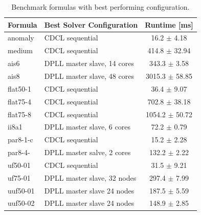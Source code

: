 \documentclass[letterpaper]{article}
\begin{document}
\begin{table}
    \centering
    \begin{tabular}{|l|l|c|}
        \hline
        Formula & Best Solver Configuration & Runtime [ms]\\
        \hline
        \hline
        anomaly & CDCL sequential & 16.2 $\pm$ 4.18 \\
        \hline
        medium & CDCL sequential & 414.8 $\pm$ 32.94 \\
        \hline
        ais6 & DPLL master slave, 14 cores & 343.3 $\pm$ 3.58 \\
        \hline
        ais8 & DPLL master slave, 48 cores & 3015.3 $\pm$ 58.85 \\
        \hline
        flat50-1 & CDCL sequential & 36.4 $\pm$ 9.07 \\
        \hline
        flat75-4 & CDCL sequential & 702.8 $\pm$ 38.18 \\
        \hline
        flat75-8 & CDCL sequential & 1054.2 $\pm$ 50.72 \\
        \hline
        ii8a1 & DPLL master slave, 6 cores & 72.2 $\pm$ 0.79 \\
        \hline
        par8-1-c & CDCL sequential & 15.2 $\pm$ 2.28 \\
        \hline
        par8-4- & DPLL master salve, 2 cores & 132.2 $\pm$ 2.22 \\
        \hline
        uf50-01 & CDCL sequential & 31.5 $\pm$ 9.21 \\
        \hline
        uf75-01 & DPLL master slave, 32 nodes & 297.4 $\pm$ 7.99 \\
        \hline
        uuf50-01 & DPLL master slave 24 nodes & 187.5 $\pm$ 5.59 \\
        \hline
        uuf50-02 & DPLL master slave 24 nodes & 148.9 $\pm$ 2.85 \\
        \hline
    \end{tabular}
    \caption{Benchmark formulas with best performing configuration.}
    \label{tab:cnfs_parallel}
\end{table}
\end{document}
